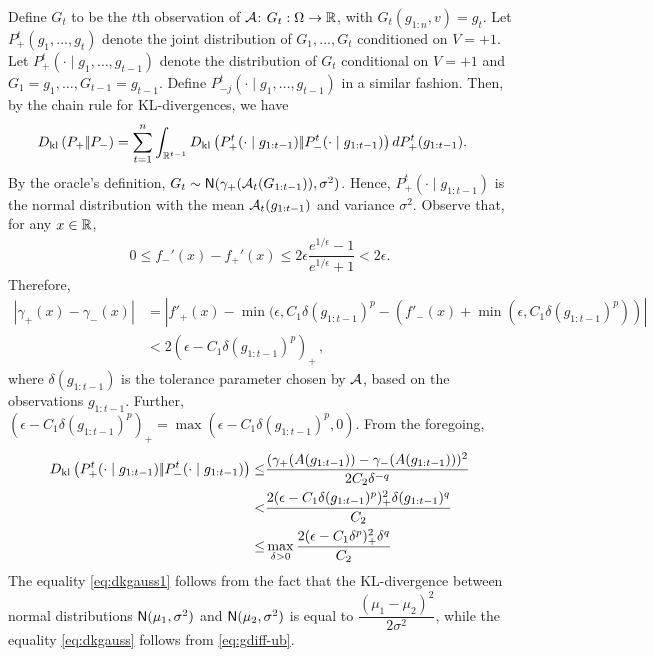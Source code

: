 Define $G_t$ to be the $t$th observation of $\mathcal{A}$: $G_t:\Omega \to \mathbb{R}$, with $G_t( g_{1:n}, v) = g_t$.
Let $P_+^t(g_1,\dots,g_t)$ denote the joint distribution of $G_1,\dots,G_t$ conditioned on $V=+1$.
Let $P_{+}^t(\cdot\mid g_1,\ldots,g_{t-1})$ denote the distribution of $G_t$ conditional on $V=+1$ and $G_1=g_1,\ldots,G_{t-1}=g_{t-1}$. Define  $P_{-j}^t(\cdot\mid g_1,\ldots,g_{t-1})$ in a similar fashion.
Then, by the chain rule for KL-divergences, we have
\begin{align}
\label{eq:dklchain}
&D_{\rm kl}\left({P_{+}} |\!| {P_{-}} \right)= \sum_{t=1}^n \int_{\mathbb{R}^{t-1}} D_{\rm kl}\left({P_{+}^t(\cdot\mid g_{1:t-1})} |\!| {P_{-}^t(\cdot\mid g_{1:t-1})} \right) d P_{+}^t( g_{1:t-1}).
\end{align}
By the oracle's definition, $G_t \sim  \mathsf{N}(\gamma_{+}(\mathcal{A}_t(G_{1:t-1})),\sigma^2)$. Hence, 
$P_{+}^t(\cdot\mid g_{1:t-1})$ is the normal distribution with the mean $\mathcal{A}_t(g_{1:t-1})$ and variance $\sigma^2$.
Observe that, for any $x\in \mathbb{R}$, 
\begin{align*}
0 \le f_-'(x) - f_+'(x) \le 2\epsilon \dfrac{e^{1/\epsilon}-1}{e^{1/\epsilon}+1} < 2\epsilon .
\end{align*}
Therefore,
\begin{align}
 |\gamma_+(x) - \gamma_-(x)| 
& = | f'_+(x) - \min(\epsilon,C_1 \delta(g_{1:t-1})^p - (f'_-(x)+\min(\epsilon,C_1 \delta(g_{1:t-1})^p)) | \nonumber \\
& < 2 (\epsilon - C_1 \delta(g_{1:t-1})^p)_+\,,
 \label{eq:gdiff-ub}
\end{align}
where $\delta(g_{1:t-1})$ is the tolerance parameter chosen by $\mathcal{A}$, based on the observations $g_{1:t-1}$. Further, $(\epsilon - C_1 \delta(g_{1:t-1})^p)_+ = \max(\epsilon - C_1 \delta(g_{1:t-1})^p,0)$. 
From the foregoing, 
\begin{align}
D_{\rm kl}\left({P_{+}^t(\cdot\mid g_{1:t-1})} |\!| {P_{-}^t(\cdot\mid g_{1:t-1})} \right)\le&\dfrac{(\gamma_{+}(A(g_{1:t-1})) - \gamma_{-}(A(g_{1:t-1})))^2}{2 C_2\delta^{-q}}\label{eq:dkgauss1}\\
<& \dfrac{2(\epsilon-C_1\delta(g_{1:t-1})^p)_+^2\delta(g_{1:t-1})^q}{C_2}\label{eq:dkgauss}\\
 \le & \max_{\delta>0} \dfrac{2(\epsilon-C_1\delta^p)_+^2\delta^q}{C_2}
\end{align}
The equality \eqref{eq:dkgauss1} follows from the fact that the KL-divergence between normal distributions $\mathsf{N}(\mu_1,\sigma^2)$ and $\mathsf{N}(\mu_2,\sigma^2)$ is equal to $\dfrac{(\mu_1 - \mu_2)^2}{2 \sigma^2}$, while the equality \eqref{eq:dkgauss} follows from \eqref{eq:gdiff-ub}.

